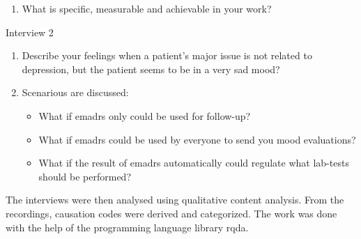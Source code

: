 \documentclass[12pt,a4paper,oneside]{article}
\let\oldcite\cite
\renewcommand*\cite[1]{\textsuperscript{\oldcite{#1}}}
\begin{document}
\begin{enumerate}[label=1.\arabic*.]
\item {\bf} What is specific, measurable and achievable in your work?
\end{enumerate}
Interview 2
\begin{enumerate}[label=2.\arabic*.]
\item {\bf} Describe your feelings when a patient's major issue is not related to depression, but the patient seems to be in a very sad mood? 
\item {\bf} Scenarious are discussed:
\begin{itemize}\vspace{-.5em}
\item {\bf} What if e{\sc madrs} only could be used for follow-up?
\item {\bf} What if e{\sc madrs} could be used by everyone to send you mood evaluations?
\item {\bf} What if the result of e{\sc madrs} automatically could regulate what lab-tests should be performed?
\end{itemize}
\end{enumerate}
The interviews were then analysed using qualitative content analysis\cite{analysis1}. From the recordings, causation codes were derived and categorized. The work was done with the help of the programming language library {\sc rqda}\cite{rqda}.
\end{document}
